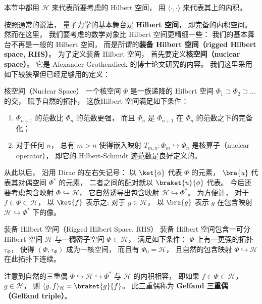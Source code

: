 
本节中都用 $\mathcal{H}$ 来代表所要考虑的 Hilbert 空间， 用 $\langle\cdot,\cdot\rangle$ 来代表其上的内积。 

按照通常的说法， 量子力学的基本舞台是 \textbf{Hilbert 空间}， 即完备的内积空间。 然而在这里， 我们要考虑的数学对象比 Hilbert 空间更精细一些： 我们的基本舞台不再是一般的 Hilbert 空间， 而是所谓的\textbf{装备 Hilbert 空间（rigged Hilbert space, RHS）}。 为了定义装备 Hilbert 空间， 首先要定义\textbf{核空间（nuclear space）}。 它是 Alexander Grothendieck 的博士论文研究的内容。 我们这里采用如下较狭窄但已经足够用的定义：

\begin{definition}{核空间（Nuclear Space）}
一个核空间 $\Phi$ 是一族递降的 Hilbert 空间 $\Phi_1\supset\Phi_2\supset...$ 的交， 赋予自然的拓扑， 这族Hilbert 空间满足如下条件：
\begin{enumerate}
\item $\Phi_{n+1}$ 的范数比 $\Phi_n$ 的范数更强， 而且 $\Phi_n$ 是 $\Phi_{n+1}$ 在 $\Phi_n$ 的范数之下的完备化；
\item 对于任何 $n$， 总有 $m>n$ 使得嵌入映射 $T_{m,n}:\Phi_{m}\hookrightarrow\Phi_n$ 是核算子（nuclear operator）， 即它的 Hilbert-Schmidt 迹范数是良好定义的。
\end{enumerate}
\end{definition}

    从此以后， 沿用 Dirac 的左右矢记号： 以 $\ket{\phi}$ 代表 $\Phi$ 的元素， $\bra{u}$ 代表其对偶空间 $\Phi^*$ 的元素， 二者之间的配对就以 $\braket{u}{\phi}$ 代表。 今后还要考虑包含映射 $\Phi\hookrightarrow\mathcal{H}$， 它自然诱导出包含映射 $\mathcal{H}\hookrightarrow\Phi^*$。 为方便计， 对于 $f\in\Phi\subset\mathcal{H}$， 以 $\ket{f}$ 表示之; 对于 $g\in\mathcal{H}$， 以 $\bra{g}$ 表示 $g$ 在包含映射 $\mathcal{H}\hookrightarrow\Phi^*$ 下的像。

\begin{definition}{装备 Hilbert 空间（Rigged Hilbert Space, RHS）}
装备 Hilbert 空间包含一可分 Hilbert 空间 $\mathcal{H}$ 与一稠密子空间 $\Phi\subset\mathcal{H}$， 满足如下条件： $\Phi$ 上有一更强的拓扑 $\tau_\Phi$， 使得 $(\Phi,\tau_\Phi)$ 成为一核空间， 而且有 $\Phi_0=\mathcal{H}$， 且自然的包含映射 $\Phi\hookrightarrow\mathcal{H}$ 在此拓扑下连续。
\end{definition}

    注意到自然的三重偶 $\Phi\hookrightarrow\mathcal{H}\hookrightarrow\Phi^*$ 与 $\mathcal{H}$ 的内积相容， 即如果 $f\in\Phi\subset\mathcal{H}$， $g\in\mathcal{H}$， 则 $\langle g,f\rangle_{\mathcal{H}}=\braket{g}{f}$。 此三重偶称为 \textbf{Gelfand 三重偶（Gelfand triple）}。

